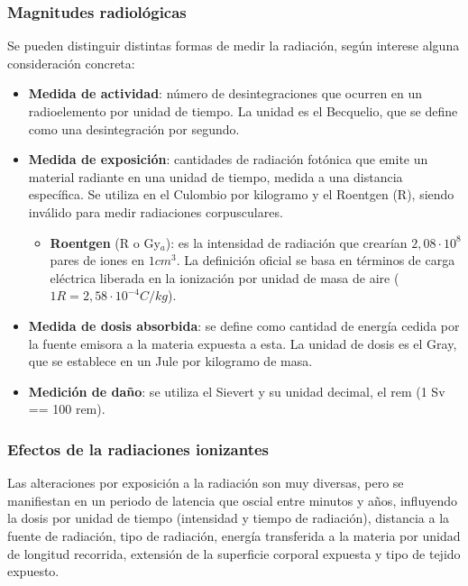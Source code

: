 \subsubsection{Magnitudes radiológicas}
Se pueden distinguir distintas formas de medir la radiación, según interese alguna consideración concreta:
\begin{itemize}[itemsep=0pt,parsep=0pt,topsep=0pt,partopsep=0pt]
    \item \textbf{Medida de actividad}: número de desintegraciones que ocurren en un radioelemento por unidad de tiempo. La unidad es el Becquelio, que se define como una desintegración por segundo.
    \item \textbf{Medida de exposición}: cantidades de radiación fotónica que emite un material radiante en una unidad de tiempo, medida a una distancia específica. Se utiliza en el Culombio por kilogramo y el Roentgen (R), siendo inválido para medir radiaciones corpusculares.
    \begin{itemize}[itemsep=0pt,parsep=0pt,topsep=0pt,partopsep=0pt]
        \item \textbf{Roentgen} (R o Gy$_a$): es la intensidad de radiación que crearían $2,08\cdot 10^8$ pares de iones en $1 cm^3$. La definición oficial se basa en términos de carga eléctrica liberada en la ionización por unidad de masa de aire ($1 R = 2,58\cdot 10^{-4} C/kg$).
    \end{itemize}
    \item \textbf{Medida de dosis absorbida}: se define como cantidad de energía cedida por la fuente emisora a la materia expuesta a esta. La unidad de dosis es el Gray, que se establece en un Jule por kilogramo de masa.
    \item \textbf{Medición de daño}: se utiliza el Sievert y su unidad decimal, el rem (1 Sv == 100 rem).
\end{itemize}
\subsubsection{Efectos de la radiaciones ionizantes}
Las alteraciones por exposición a la radiación son muy diversas, pero se manifiestan en un periodo de latencia que oscial entre minutos y años, influyendo la dosis por unidad de tiempo (intensidad y tiempo de radiación), distancia a la fuente de radiación, tipo de radiación, energía transferida a la materia por unidad de longitud recorrida, extensión de la superficie corporal expuesta y tipo de tejido expuesto.
